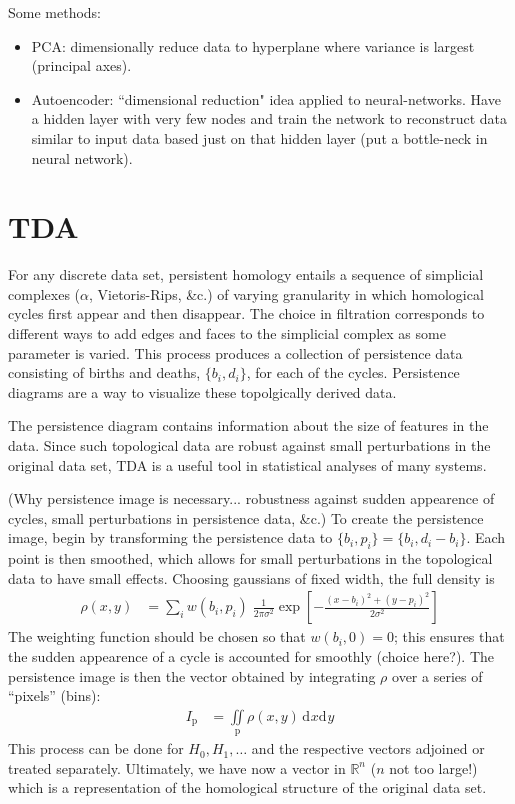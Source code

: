 \documentclass[11pt]{article}
\renewcommand{\d}[2][]{\mathrm{d}^{#1}{#2}}
\begin{document}
Some methods:
\begin{itemize}
    \item PCA: dimensionally reduce data to hyperplane where variance is largest (principal axes).
    \item Autoencoder: ``dimensional reduction" idea applied to neural-networks. Have a hidden layer with very few nodes and train the network to reconstruct data similar to input data based just on that hidden layer (put a bottle-neck in neural network).
\end{itemize}


\section{TDA}
For any discrete data set, persistent homology entails a sequence of simplicial complexes ($\alpha$, Vietoris-Rips, \&c.) of varying granularity in which homological cycles first appear and then disappear. The choice in filtration corresponds to different ways to add edges and faces to the simplicial complex as some parameter is varied. This process produces a collection of persistence data consisting of births and deaths, $\{b_i,d_i\}$, for each of the cycles. Persistence diagrams are a way to visualize these topolgically derived data.

The persistence diagram contains information about the size of features in the data. Since such topological data are robust against small perturbations in the original data set, TDA is a useful tool in statistical analyses of many systems.


(Why persistence image is necessary... robustness against sudden appearence of cycles, small perturbations in persistence data, \&c.) To create the persistence image, begin by transforming the persistence data to $\{b_i,p_i\}=\{b_i,d_i-b_i\}$. Each point is then smoothed, which allows for small perturbations in the topological data to have small effects. Choosing gaussians of fixed width, the full density is
\begin{align}
    \rho(x,y) &= \sum_i w(b_i,p_i)\;\frac{1}{2\pi\sigma^2}\exp\left[-\frac{(x-b_i)^2+(y-p_i)^2}{2\sigma^2}\right]
\end{align}
The weighting function should be chosen so that $w(b_i,0)=0$; this ensures that the sudden appearence of a cycle is accounted for smoothly (choice here?). The persistence image is then the vector obtained by integrating $\rho$ over a series of ``pixels'' (bins):
\begin{align}
    I_\text{p} &= \iint\limits_\text{p}\rho(x,y)\,\d{x}\d{y}
\end{align}
This process can be done for $H_0,H_1,\ldots$ and the respective vectors adjoined or treated separately. Ultimately, we have now a vector in $\mathbb{R}^n$ ($n$ not too large!) which is a representation of the homological structure of the original data set.
\end{document}
